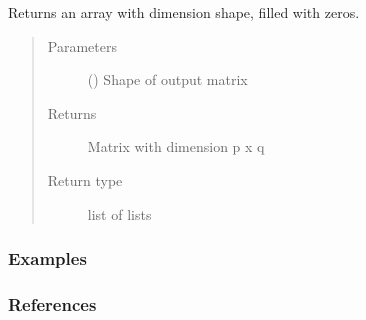 \documentclass[letterpaper,10pt,english]{sphinxmanual}
\begin{document}
\begin{fulllineitems}
Returns an array with dimension shape, filled with zeros.
\begin{quote}\begin{description}
\item[{Parameters}] \leavevmode
{} () \textendash{} Shape of output matrix

\item[{Returns}] \leavevmode
{} \textendash{} Matrix with dimension p x q

\item[{Return type}] \leavevmode
list of lists

\end{description}\end{quote}
\subsubsection*{Examples}

\begin{sphinxVerbatim}[commandchars=\\\{\}]
 
 
 
\end{sphinxVerbatim}

\end{fulllineitems}

\subsubsection*{References}


\renewcommand{\indexname}{Python Module Index}
\begin{sphinxtheindex}
\let\bigletter\sphinxstyleindexlettergroup
\bigletter{a}
\item\relax{}
\end{sphinxtheindex}

\renewcommand{\indexname}{Index}
\printindex
\end{document}
